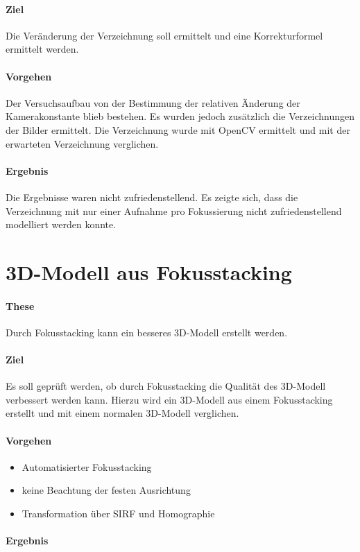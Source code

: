 \documentclass[./00PhotoBox.tex]{subfiles}
\begin{document}
\paragraph{Ziel}
Die Veränderung der Verzeichnung soll ermittelt und eine Korrekturformel ermittelt werden.

\paragraph{Vorgehen}
Der Versuchsaufbau von der Bestimmung der relativen Änderung der Kamerakonstante blieb bestehen. Es wurden jedoch zusätzlich die Verzeichnungen der Bilder ermittelt. Die Verzeichnung wurde mit OpenCV ermittelt und mit der erwarteten Verzeichnung verglichen.

\paragraph{Ergebnis}
Die Ergebnisse waren nicht zufriedenstellend. Es zeigte sich, dass die Verzeichnung mit nur einer Aufnahme pro Fokussierung nicht zufriedenstellend modelliert werden konnte.


\section{3D-Modell aus Fokusstacking}

\paragraph{These}
Durch Fokusstacking kann ein besseres 3D-Modell erstellt werden.

\paragraph{Ziel}
Es soll geprüft werden, ob durch Fokusstacking die Qualität des 3D-Modell verbessert werden kann. Hierzu wird ein 3D-Modell aus einem Fokusstacking erstellt und mit einem normalen 3D-Modell verglichen.

\paragraph{Vorgehen}
\begin{itemize}
    \item Automatisierter Fokusstacking
    \item keine Beachtung der festen Ausrichtung
    \item Transformation über SIRF und Homographie
\end{itemize}

\paragraph{Ergebnis}

\biblio
\end{document}
